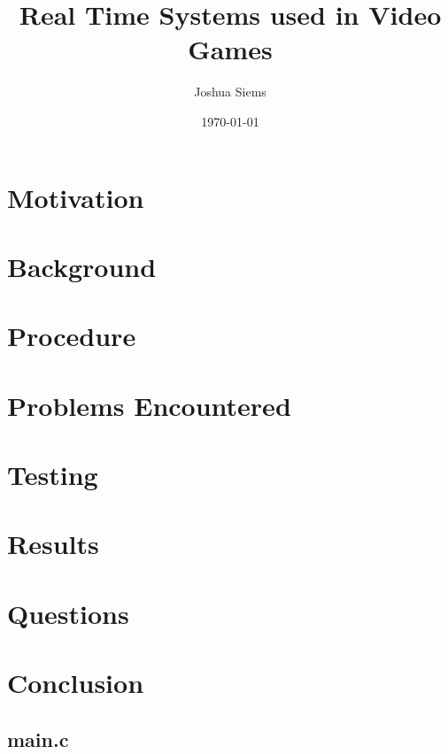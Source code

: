 \documentclass[a4paper, 12pt]{article}
\title{Real Time Systems used in Video Games}
\author{Joshua Siems}
\date{\today}
\begin{document}

\maketitle

\newpage

    \tableofcontents

\newpage


\section{Motivation}

\newpage

\section{Background}

\newpage

\section{Procedure}

\newpage

\section{Problems Encountered}

\newpage

\section{Testing}

\newpage

\section{Results}

\newpage

\section{Questions}

\newpage

\section{Conclusion}

\newpage

\begin{appendices}

\section{main.c}

\end{appendices}
\end{document}
